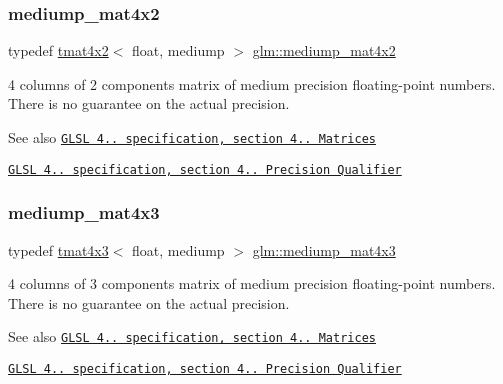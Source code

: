 \subsubsection{\texorpdfstring{mediump\+\_\+mat4x2}{mediump\_mat4x2}}
{\footnotesize\ttfamily typedef \hyperlink{structglm_1_1tmat4x2}{tmat4x2}$<$ float, mediump $>$ \hyperlink{group__core__precision_gaa8a2840660d106dca70acf525e8bfa6c}{glm\+::mediump\+\_\+mat4x2}}

4 columns of 2 components matrix of medium precision floating-\/point numbers. There is no guarantee on the actual precision.

\begin{DoxySeeAlso}{See also}
\href{http://www.opengl.org/registry/doc/GLSLangSpec.4.20.8.pdf}{\tt G\+L\+SL 4.. specification, section 4.. Matrices} 

\href{http://www.opengl.org/registry/doc/GLSLangSpec.4.20.8.pdf}{\tt G\+L\+SL 4.. specification, section 4.. Precision Qualifier} 
\end{DoxySeeAlso}
\mbox{\label{group__core__precision_ga98bbda89d371b41b3d56bcbc7a4d868d}} 
\subsubsection{\texorpdfstring{mediump\+\_\+mat4x3}{mediump\_mat4x3}}
{\footnotesize\ttfamily typedef \hyperlink{structglm_1_1tmat4x3}{tmat4x3}$<$ float, mediump $>$ \hyperlink{group__core__precision_ga98bbda89d371b41b3d56bcbc7a4d868d}{glm\+::mediump\+\_\+mat4x3}}

4 columns of 3 components matrix of medium precision floating-\/point numbers. There is no guarantee on the actual precision.

\begin{DoxySeeAlso}{See also}
\href{http://www.opengl.org/registry/doc/GLSLangSpec.4.20.8.pdf}{\tt G\+L\+SL 4.. specification, section 4.. Matrices} 

\href{http://www.opengl.org/registry/doc/GLSLangSpec.4.20.8.pdf}{\tt G\+L\+SL 4.. specification, section 4.. Precision Qualifier} 
\end{DoxySeeAlso}
\mbox{\label{group__core__precision_gaad45864262bb2cf923667fde779a0058}} 
